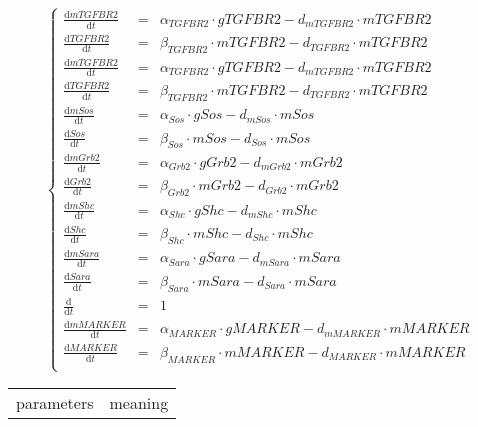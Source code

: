 \documentclass[12pt]{article}
\begin{document}
\begin{equation}
    \left\{
    \begin{array}{lll}
        \frac{\mathrm{d} mTGFBR2 }{\mathrm{d}t}  & = &  \alpha_{TGFBR2} \cdot gTGFBR2 - d_{mTGFBR2} \cdot mTGFBR2 \\
        \frac{\mathrm{d} TGFBR2 }{\mathrm{d}t}  & = &  \beta_{TGFBR2} \cdot mTGFBR2 - d_{TGFBR2} \cdot mTGFBR2 \\

        \frac{\mathrm{d} mTGFBR2 }{\mathrm{d}t}  & = &  \alpha_{TGFBR2} \cdot gTGFBR2 - d_{mTGFBR2} \cdot mTGFBR2 \\
        \frac{\mathrm{d} TGFBR2 }{\mathrm{d}t}  & = &  \beta_{TGFBR2} \cdot mTGFBR2 - d_{TGFBR2} \cdot mTGFBR2 \\

        \frac{\mathrm{d} mSos }{\mathrm{d}t}  & = &  \alpha_{Sos} \cdot gSos - d_{mSos} \cdot mSos \\
        \frac{\mathrm{d} Sos }{\mathrm{d}t}  & = &  \beta_{Sos} \cdot mSos - d_{Sos} \cdot mSos \\

        
        \frac{\mathrm{d} mGrb2 }{\mathrm{d}t}  & = &  \alpha_{Grb2} \cdot gGrb2 - d_{mGrb2} \cdot mGrb2 \\
        \frac{\mathrm{d} Grb2 }{\mathrm{d}t}  & = &  \beta_{Grb2} \cdot mGrb2 - d_{Grb2} \cdot mGrb2 \\


        \frac{\mathrm{d} mShc }{\mathrm{d}t}  & = &  \alpha_{Shc} \cdot gShc - d_{mShc} \cdot mShc \\
        \frac{\mathrm{d} Shc }{\mathrm{d}t}  & = &  \beta_{Shc} \cdot mShc - d_{Shc} \cdot mShc \\

        
        \frac{\mathrm{d} mSara }{\mathrm{d}t}  & = &  \alpha_{Sara} \cdot gSara - d_{mSara} \cdot mSara \\
        \frac{\mathrm{d} Sara }{\mathrm{d}t}  & = &  \beta_{Sara} \cdot mSara - d_{Sara} \cdot mSara \\

        \frac{\mathrm{d}  }{\mathrm{d}t}  & = &  1\\



        
        \frac{\mathrm{d} mMARKER }{\mathrm{d}t}  & = &  \alpha_{MARKER} \cdot gMARKER - d_{mMARKER} \cdot mMARKER \\
        \frac{\mathrm{d} MARKER }{\mathrm{d}t}  & = &  \beta_{MARKER} \cdot mMARKER - d_{MARKER} \cdot mMARKER \\
    \end{array}\right.
\end{equation}

\begin{table}[H]
    \centering
    \begin{tabular}{cc}
        parameters & meaning \\ 
        
    \end{tabular}
\end{table}
\end{document}
